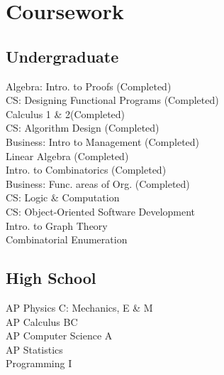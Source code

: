 \documentclass[letterpaper]{deedy-resume} %
\begin{document}
\begin{minipage}[t]{0.33\textwidth}

\sectionspace %



\section{Coursework}

\subsection{Undergraduate}

Algebra: Intro. to Proofs (Completed) \\
CS: Designing Functional Programs (Completed) \\
Calculus 1 \& 2(Completed) \\
CS: Algorithm Design (Completed) \\
Business: Intro to Management (Completed) \\
Linear Algebra (Completed) \\
Intro. to Combinatorics (Completed) \\
Business: Func. areas of Org. (Completed) \\
CS: Logic \& Computation \\
CS: Object-Oriented Software Development \\
Intro. to Graph Theory \\
Combinatorial Enumeration

\sectionspace %


\subsection{High School}

AP Physics C: Mechanics, E \& M \\
AP Calculus BC \\
AP Computer Science A \\
AP Statistics \\
Programming I \\

\sectionspace %


\end{minipage} %
\end{document}
